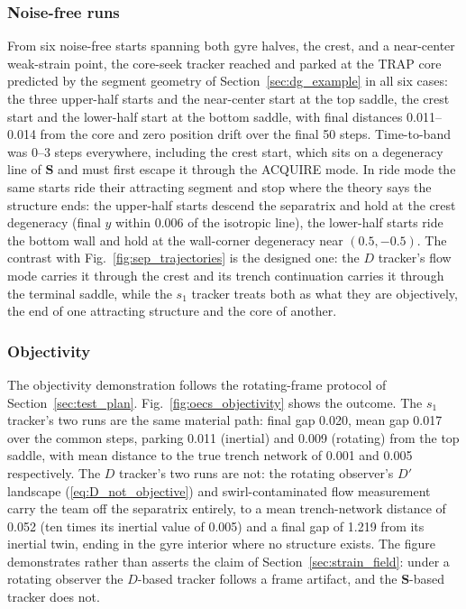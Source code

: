 \documentclass[lettersize,journal]{IEEEtran}
\begin{document}
\subsubsection{Noise-free runs}
From six noise-free starts spanning both gyre halves, the crest, and a
near-center weak-strain point, the core-seek tracker reached and parked
at the TRAP core predicted by the segment geometry of
Section~\ref{sec:dg_example} in all six cases: the three upper-half
starts and the near-center start at the top saddle, the crest start and
the lower-half start at the bottom saddle, with final distances
0.011--0.014 from the core and zero position drift over the final 50
steps. Time-to-band was 0--3 steps everywhere, including the crest
start, which sits on a degeneracy line of $\mathbf{S}$ and must first
escape it through the ACQUIRE mode. In ride mode the same starts ride
their attracting segment and stop where the theory says the structure
ends: the upper-half starts descend the separatrix and hold at the
crest degeneracy (final $y$ within 0.006 of the isotropic line), the
lower-half starts ride the bottom wall and hold at the wall-corner
degeneracy near $(0.5, -0.5)$. The contrast with
Fig.~\ref{fig:sep_trajectories} is the designed one: the $D$ tracker's flow
mode carries it through the crest and its trench continuation carries
it through the terminal saddle, while the $s_1$ tracker treats both as
what they are objectively, the end of one attracting structure and the
core of another.

\subsubsection{Objectivity}
The objectivity demonstration follows the rotating-frame protocol of
Section~\ref{sec:test_plan}. Fig.~\ref{fig:oecs_objectivity} shows the
outcome. The
$s_1$ tracker's two runs are the same material path: final gap 0.020,
mean gap 0.017 over the common steps, parking 0.011 (inertial) and
0.009 (rotating) from the top saddle, with mean distance to the true
trench network of 0.001 and 0.005 respectively. The $D$
tracker's two runs are not: the rotating observer's $D'$ landscape (\ref{eq:D_not_objective})
and swirl-contaminated flow measurement carry the team off the
separatrix entirely, to a mean trench-network distance of 0.052 (ten
times its inertial value of 0.005) and a final gap of 1.219 from its
inertial twin, ending in the gyre interior where no structure exists.
The figure demonstrates rather than asserts the claim of
Section~\ref{sec:strain_field}: under a rotating observer the
$D$-based tracker follows a frame artifact, and the $\mathbf{S}$-based
tracker does not.
\end{document}
